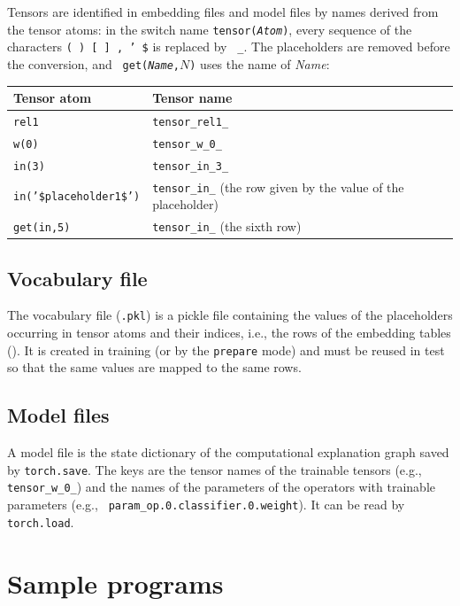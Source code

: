 \documentclass[a4paper]{report}
\begin{document}
Tensors are identified in embedding files and model files by names
derived from the tensor atoms: in the switch name {\tt tensor({\it Atom})},
every sequence of the characters {\tt ( ) [ ] , ' \$} is replaced by {\tt
	\_}.  The placeholders are removed before the conversion, and {\tt
	get({\it Name},$N$)} uses the name of {\it Name}:
\begin{center}
	\begin{tabular}{ll}
		\toprule
		Tensor atom & Tensor name \\
		\midrule
		{\tt rel1} & {\tt tensor\_rel1\_} \\
		{\tt w(0)} & {\tt tensor\_w\_0\_} \\
		{\tt in(3)} & {\tt tensor\_in\_3\_} \\
		{\tt in('\$placeholder1\$')} & {\tt tensor\_in\_} (the row given by the value of the placeholder) \\
		{\tt get(in,5)} & {\tt tensor\_in\_} (the sixth row) \\
		\bottomrule
	\end{tabular}
\end{center}

\section{Vocabulary file}
\label{sec:vocab_file}

The vocabulary file ({\tt .pkl}) is a pickle file containing the values of
the placeholders occurring in tensor atoms and their indices, i.e., the
rows of the embedding tables ().  It is created
in training (or by the {\tt prepare} mode) and must be reused in test so
that the same values are mapped to the same rows.

\section{Model files}
\label{sec:model_file}

A model file is the state dictionary of the computational explanation
graph saved by {\tt torch.save}.  The keys are the tensor names of the
trainable tensors (e.g., {\tt tensor\_w\_0\_}) and the names of the
parameters of the operators with trainable parameters (e.g., {\tt
	param\_op.0.classifier.0.weight}).  It can be read by {\tt torch.load}.

\chapter{Sample programs}
\label{chap:tprism_sample}
\end{document}
